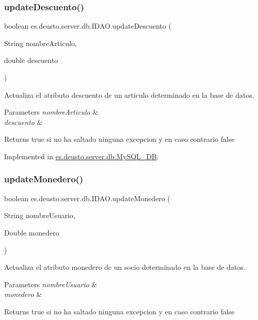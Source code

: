 \subsubsection{\texorpdfstring{updateDescuento()}{updateDescuento()}}
{\footnotesize\ttfamily boolean es.\+deusto.\+server.\+db.\+I\+D\+A\+O.\+update\+Descuento (\begin{DoxyParamCaption}\item[{String}]{nombre\+Articulo,  }\item[{double}]{descuento }\end{DoxyParamCaption})}

Actualiza el atributo descuento de un articulo determinado en la base de datos. 
\begin{DoxyParams}{Parameters}
{\em nombre\+Articulo} & \\
\hline
{\em descuento} & \\
\hline
\end{DoxyParams}
\begin{DoxyReturn}{Returns}
true si no ha saltado ninguna excepcion y en caso contrario false 
\end{DoxyReturn}


Implemented in \mbox{\hyperlink{classes_1_1deusto_1_1server_1_1db_1_1_my_s_q_l___d_b_ad2208a15e02b51a82e8cbd9afd4ea939}{es.\+deusto.\+server.\+db.\+My\+S\+Q\+L\+\_\+\+DB}}.

\mbox{\label{interfacees_1_1deusto_1_1server_1_1db_1_1_i_d_a_o_a59a5efa0070985e6baa0d2890b9ac266}} 
\subsubsection{\texorpdfstring{updateMonedero()}{updateMonedero()}}
{\footnotesize\ttfamily boolean es.\+deusto.\+server.\+db.\+I\+D\+A\+O.\+update\+Monedero (\begin{DoxyParamCaption}\item[{String}]{nombre\+Usuario,  }\item[{Double}]{monedero }\end{DoxyParamCaption})}

Actualiza el atributo monedero de un socio determinado en la base de datos. 
\begin{DoxyParams}{Parameters}
{\em nombre\+Usuario} & \\
\hline
{\em monedero} & \\
\hline
\end{DoxyParams}
\begin{DoxyReturn}{Returns}
true si no ha saltado ninguna excepcion y en caso contrario false 
\end{DoxyReturn}


